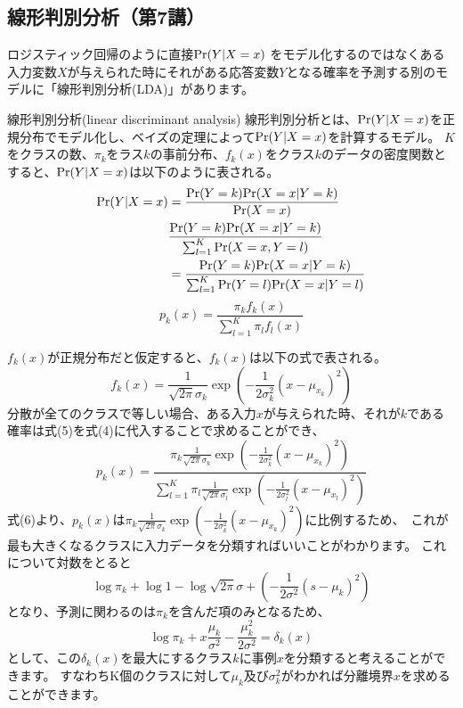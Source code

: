 \documentclass[uplatex]{jsarticle}
\begin{document}
\subsection{線形判別分析（第7講）}
ロジスティック回帰のように直接${\rm Pr}(Y| X = x)$ をモデル化するのではなくある入力変数$X$が与えられた時にそれがある応答変数$Y$となる確率を予測する別のモデルに「線形判別分析(LDA)」があります。\
\begin{itembox}[l]{線形判別分析(linear discriminant analysis)}
  線形判別分析とは、${\rm Pr}(Y| X = x)$を正規分布でモデル化し、ベイズの定理によって${\rm Pr}(Y| X = x)$を計算するモデル。
  $K$をクラスの数、$\pi_k$をラス$k$の事前分布、$f_k(x)$をクラス$k$のデータの密度関数とすると、${\rm Pr}(Y| X = x)$は以下のように表される。
  \begin{equation}
    \begin{split}
      {\rm Pr}(Y| X = x) &= \frac{{\rm Pr}(Y = k){\rm Pr}(X = x| Y = k)}{{\rm Pr}(X = x)} \\
      &\frac{{\rm Pr}(Y = k){\rm Pr}(X = x| Y = k)}{\sum_{l=1}^K{\rm Pr}(X = x, Y = l)}\\
      &=\frac{{\rm Pr}(Y = k){\rm Pr}(X = x| Y = k)}{\sum_{l=1}^K{\rm Pr}(Y = l){\rm Pr}(X = x|Y = l)}\\
    \end{split}
  \end{equation}
    \begin{equation}
      p_k(x) = \frac{\pi_kf_k(x)}{\sum_{l=1}^K \pi_lf_l(x)}
    \end{equation}
\end{itembox}
$f_k(x)$が正規分布だと仮定すると、$f_k(x)$は以下の式で表される。
\begin{equation}
  f_k(x) = \frac{1}{\sqrt{2\pi}\sigma_k}\exp{\left(- \frac{1}{2\sigma_k^2}(x - \mu_{x_k})^2\right)}
\end{equation}
分散が全てのクラスで等しい場合、ある入力$x$が与えられた時、それが$k$である確率は式(5)を式(4)に代入することで求めることができ、\
\begin{equation}
        p_k(x) = \frac{\pi_k \frac{1}{\sqrt{2\pi}\sigma_k}\exp{\left(- \frac{1}{2\sigma_k^2}(x - \mu_{x_k})^2\right)}}{\sum_{l=1}^K \pi_l\frac{1}{\sqrt{2\pi}\sigma_l}\exp{\left(- \frac{1}{2\sigma_l^2}(x - \mu_{x_l})^2\right)}}
\end{equation}
式(6)より、$p_k(x)$は$\pi_k \frac{1}{\sqrt{2\pi}\sigma_k}\exp{\left(- \frac{1}{2\sigma_k^2}(x - \mu_{x_k})^2\right)}$に比例するため、\
これが最も大きくなるクラスに入力データを分類すればいいことがわかります。
これについて対数をとると
$$\log{\pi_k} + \log{1} - \log{\sqrt{2\pi}\sigma} + \left(-\frac{1}{2\sigma^2}(s - \mu_k)^2 \right)$$
となり、予測に関わるのは$\pi_k$を含んだ項のみとなるため、
\begin{equation}
  \log{\pi_k} + x \frac{\mu_k}{\sigma^2} - \frac{\mu_k^2}{2\sigma^2} = \delta_k(x)
\end{equation}
として、この$\delta_k(x)$を最大にするクラス$k$に事例$x$を分類すると考えることができます。
すなわちK個のクラスに対して$\mu_k及び\sigma_k^2$がわかれば分離境界$x$を求めることができます。
\end{document}
